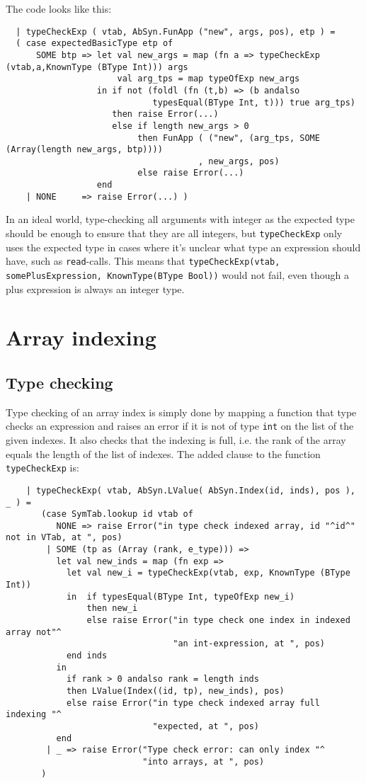 \documentclass{article}
\begin{document}
The code looks like this:
\begin{lstlisting}
  | typeCheckExp ( vtab, AbSyn.FunApp ("new", args, pos), etp ) =
  ( case expectedBasicType etp of
      SOME btp => let val new_args = map (fn a => typeCheckExp (vtab,a,KnownType (BType Int))) args
                      val arg_tps = map typeOfExp new_args
                  in if not (foldl (fn (t,b) => (b andalso
                             typesEqual(BType Int, t))) true arg_tps)
                     then raise Error(...)
                     else if length new_args > 0
                          then FunApp ( ("new", (arg_tps, SOME (Array(length new_args, btp))))
                                      , new_args, pos)
                          else raise Error(...)
                  end
    | NONE     => raise Error(...) )
\end{lstlisting}

In an ideal world, type-checking all arguments with integer as the expected type should be enough to ensure that they are all integers, but \texttt{typeCheckExp} only uses the expected type in cases where it's unclear what type an expression should have, such as \texttt{read}-calls. This means that \texttt{typeCheckExp(vtab, somePlusExpression, KnownType(BType Bool))} would not fail, even though a plus expression is always an integer type.

\section{Array indexing}
\subsection{Type checking}
Type checking of an array index is simply done by mapping a function that type checks an expression and raises an error if it is not of type \texttt{int} on the list of the given indexes. It also checks that the indexing is full, i.e. the rank of the array equals the length of the list of indexes.
The added clause to the function \texttt{typeCheckExp} is:
\begin{lstlisting}
    | typeCheckExp( vtab, AbSyn.LValue( AbSyn.Index(id, inds), pos ), _ ) =
       (case SymTab.lookup id vtab of
          NONE => raise Error("in type check indexed array, id "^id^" not in VTab, at ", pos)
        | SOME (tp as (Array (rank, e_type))) =>
          let val new_inds = map (fn exp =>
            let val new_i = typeCheckExp(vtab, exp, KnownType (BType Int))
            in  if typesEqual(BType Int, typeOfExp new_i)
                then new_i
                else raise Error("in type check one index in indexed array not"^
                                 "an int-expression, at ", pos)
            end inds
          in
            if rank > 0 andalso rank = length inds
            then LValue(Index((id, tp), new_inds), pos)
            else raise Error("in type check indexed array full indexing "^
                             "expected, at ", pos)
          end
        | _ => raise Error("Type check error: can only index "^
                           "into arrays, at ", pos)
       )
\end{lstlisting}
\end{document}
